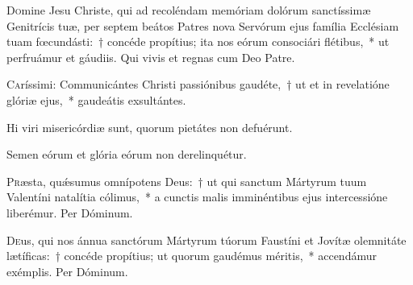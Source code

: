 \documentclass[vesperale_romanum.tex]{subfiles}
\begin{document}
\myrule


\duplex




\admagnificat


\oratio

\lettrine{D}{o}mine Jesu Christe, qui ad recoléndam memóriam dolórum san\-ctíssimæ Genitrícis tuæ, per septem beátos Patres nova Servórum ejus família Ecclésiam tuam fœcundásti:~† concéde propítius; ita nos eórum consociári flétibus,~* ut perfruámur et gáudiis. Qui vivis et regnas cum Deo Patre.

\quadcommferiae



\lettrine{C}{a}ríssimi: Communicántes Christi passiónibus gaudéte,~† ut et in revelatióne glóriæ ejus,~* gaudeátis exsultántes.

\hymnus


\vv Hi viri misericórdiæ sunt, quorum pietátes non defuérunt.

\rr Semen eórum et glória eórum non derelinquétur.

\admagnificat


\quadcommferiae

\myrule


\oratio

\lettrine{P}{r}æsta, quǽsumus omnípotens Deus:~† ut qui san\-ctum Mártyrum tuum Valentíni natalítia cólimus,~* a cun\-ctis malis imminéntibus ejus intercessióne liberémur. Per Dóminum.

\myrule


\oratio

\lettrine{D}{e}us, qui nos ánnua san\-ctórum Mártyrum túorum Faustíni et Jovítæ ole\-mnitáte lætíficas:~† concéde propítius; ut quorum gaudémus méritis,~* accendámur exémplis. Per Dóminum.
\end{document}
